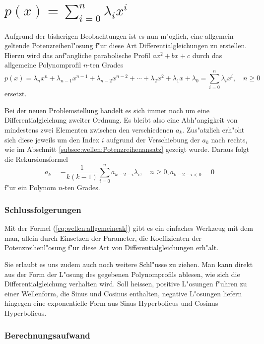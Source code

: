 \section{\texorpdfstring{$p(x) = \sum_{i=0}^{n}\lambda_ix^i$}{p(x) = summe i = 
0 bis n lambdai xi}}

Aufgrund der bisherigen Beobachtungen ist es nun m"oglich, eine 
allgemein geltende Potenzreihenl"osung f"ur diese Art Differentialgleichungen 
zu erstellen. Hierzu wird das anf"angliche parabolische Profil $ax^2 + bx + c$ 
durch das allgemeine Polynomprofil $n$-ten Grades
\begin{equation*}
	p(x) =
	\lambda_nx^n + \lambda_{n-1}x^{n-1} + \lambda_{n-2}x^{n-2} + \dotsb + 
	\lambda_2x^2 + \lambda_1x + \lambda_0 = \sum_{i=0}^{n}\lambda_ix^i, \quad n 
	\ge 0
\end{equation*}
ersetzt.

Bei der neuen Problemstellung handelt es sich immer noch um eine 
Differentialgleichung zweiter Ordnung. Es bleibt also eine Abh"angigkeit von 
mindestens zwei Elementen zwischen den verschiedenen $a_k$. Zus"atzlich erh"oht 
sich diese jeweils um den Index $i$ aufgrund der Verschiebung der $a_k$ nach 
rechts, wie im Abschnitt \ref{subsec:wellen:Potenzreihenansatz} gezeigt wurde. 
Daraus folgt die Rekursionsformel
\begin{equation}
	a_k = -\frac{1}{k(k-1)}\sum_{i=0}^{n}a_{k-2-i}\lambda_i, \quad n \ge 0, 
	a_{k-2-i < 0} =  0
	\label{eq:wellen:allgemeineak}
\end{equation}
f"ur ein Polynom $n$-ten Grades.

\subsubsection{Schlussfolgerungen}

Mit der Formel (\ref{eq:wellen:allgemeineak}) gibt es ein einfaches 
Werkzeug mit dem man, allein durch Einsetzen der Parameter, die Koeffizienten 
der Potenzreihenl"osung f"ur diese Art von Differentialgleichungen erh"alt.

Sie erlaubt es uns zudem auch noch weitere Schl"usse zu ziehen. Man kann direkt 
aus der Form der L"osung des gegebenen Polynomprofils ablesen, wie sich die 
Differentialgleichung verhalten wird. Soll heissen, positive L"osungen 
f"uhren zu einer Wellenform, die Sinus und Cosinus enthalten, negative 
L"osungen liefern hingegen eine exponentielle Form aus Sinus Hyperbolicus und 
Cosinus Hyperbolicus.

\subsubsection{Berechnungsaufwand}








